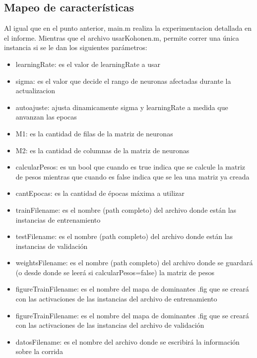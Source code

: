 \documentclass[informe.tex]{subfiles}
\begin{document}
     \newpage
     \subsection{Mapeo de características}
      Al igual que en el punto anterior, main.m realiza la experimentacion detallada en el informe. Mientras que el archivo usarKohonen.m, permite correr una \'unica instancia si se le dan los siguientes par\'ametros:
      
      \begin{itemize}
	\item learningRate: es el valor de learningRate a usar
	\item sigma: es el valor que decide el rango de neuronas afectadas durante la actualizacion
	\item autoajuste: ajusta dinamicamente sigma  y learningRate a medida que anvanzan las epocas
	\item M1: es la cantidad de filas de la matriz de neuronas
	\item M2: es la cantidad de columnas de la matriz de neuronas
	\item calcularPesos: es un bool que cuando es true indica que se calcule la matriz de pesos mientras que cuando es false indica que se lea una matriz ya creada
	\item cantEpocas: es la cantidad de \'epocas m\'axima a utilizar
	\item trainFilename: es el nombre (path completo) del archivo donde est\'an las instancias de entrenamiento
	\item testFilename: es el nombre (path completo) del archivo donde est\'an las instancias de validaci\'on
	\item weightsFilename: es el nombre (path completo) del archivo donde se guardar\'a (o desde donde se leer\'a si calcularPesos=false) la matriz de pesos
	\item figureTrainFilename: es el nombre del mapa de dominantes .fig que se crear\'a con las activaciones de las instancias del archivo de entrenamiento
	\item figureTrainFilename: es el nombre del mapa de dominantes .fig que se crear\'a con las activaciones de las instancias del archivo de validaci\'on
	\item datosFilename: es el nombre del archivo donde se escribir\'a la informaci\'on sobre la corrida
      \end{itemize}
      
    
\end{document}
